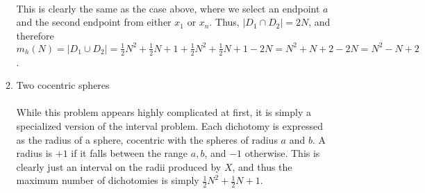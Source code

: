 \documentclass{article}
\begin{document}
\begin{enumerate}
\begin{enumerate}
		\\ This is clearly the same as the case above, where we select an endpoint $a$ and the second endpoint from either $x_1$ or $x_n$. Thus, $|D_1 \cap D_2| = 2N$, and therefore $m_h(N)=|D_1 \cup D_2|=\frac{1}{2}N^2+\frac{1}{2}N+1+\frac{1}{2}N^2+\frac{1}{2}N+1-2N=N^2 + N + 2 - 2N = N^2 - N + 2$.
	\item Two cocentric spheres
	\\\\ While this problem appears highly complicated at first, it is simply a specialized version of the interval problem. Each dichotomy is expressed as the radius of a sphere, cocentric with the spheres of radius $a$ and $b$. A radius is $+1$ if it falls between the range $a,b$, and $-1$ otherwise. This is clearly just an interval on the radii produced by $X$, and thus the maximum number of dichotomies is simply $\frac{1}{2}N^2 + \frac{1}{2}N +1$.
	\end{enumerate}
\end{enumerate}
	
\end{document}
